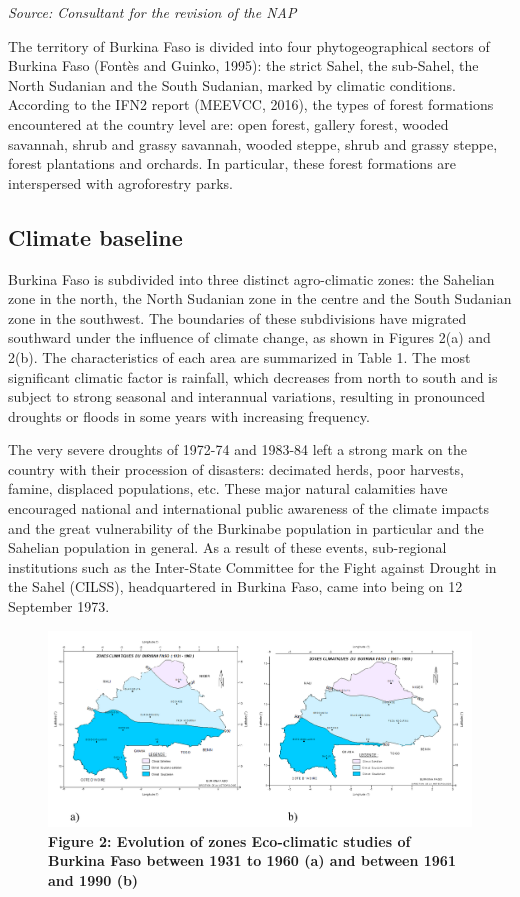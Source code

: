 \documentclass[
]{book}
\begin{document}
\emph{Source: Consultant for the revision of the NAP}

The territory of Burkina Faso is divided into four phytogeographical sectors of Burkina Faso (Fontès and Guinko, 1995): the strict Sahel, the sub-Sahel, the North Sudanian and the South Sudanian, marked by climatic conditions. According to the IFN2 report (MEEVCC, 2016), the types of forest formations encountered at the country level are: open forest, gallery forest, wooded savannah, shrub and grassy savannah, wooded steppe, shrub and grassy steppe, forest plantations and orchards. In particular, these forest formations are interspersed with agroforestry parks.

\subsection{Climate baseline}\label{climate-baseline}

Burkina Faso is subdivided into three distinct agro-climatic zones: the Sahelian zone in the north, the North Sudanian zone in the centre and the South Sudanian zone in the southwest. The boundaries of these subdivisions have migrated southward under the influence of climate change, as shown in Figures 2(a) and 2(b). The characteristics of each area are summarized in Table 1. The most significant climatic factor is rainfall, which decreases from north to south and is subject to strong seasonal and interannual variations, resulting in pronounced droughts or floods in some years with increasing frequency.

The very severe droughts of 1972-74 and 1983-84 left a strong mark on the country with their procession of disasters: decimated herds, poor harvests, famine, displaced populations, etc. These major natural calamities have encouraged national and international public awareness of the climate impacts and the great vulnerability of the Burkinabe population in particular and the Sahelian population in general. As a result of these events, sub-regional institutions such as the Inter-State Committee for the Fight against Drought in the Sahel (CILSS), headquartered in Burkina Faso, came into being on 12 September 1973.

\begin{figure}
\centering
\includegraphics{Figures and Photos/Figure 2.png}
\caption{\textbf{Figure 2: Evolution of zones Eco-climatic studies of Burkina Faso between 1931 to 1960 (a) and between 1961 and 1990 (b)}}
\end{figure}
\end{document}
